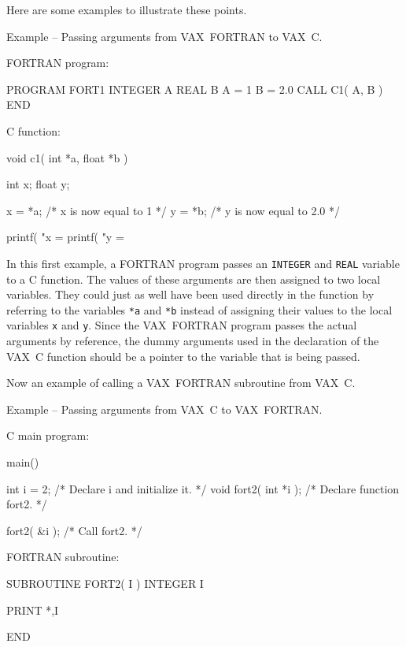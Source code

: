\documentclass[twoside,11pt,nolof]{starlink}
\newcounter{examples}
\begin{document}
Here are some examples to illustrate these points.

\label{vms_f2c}
\begin{center}
Example\latex{~\ref{vms_f2c}}
-- Passing arguments from VAX~FORTRAN to VAX~C\@.
\end{center}
\nopagebreak[4]
FORTRAN program:
\nopagebreak[4]
\begin{small}
\begin{terminalv}
      PROGRAM FORT1
      INTEGER A
      REAL B
      A = 1
      B = 2.0
      CALL C1( A, B )
      END
\end{terminalv}
\end{small}
\pagebreak[1]
C function:
\nopagebreak[4]
\begin{small}
\begin{terminalv}
void c1( int *a, float *b )
{
  int x;
  float y;

  x = *a;    /* x is now equal to 1 */
  y = *b;    /* y is now equal to 2.0 */

  printf( "x = %
  printf( "y = %
}
\end{terminalv}
\end{small}

In this first example, a FORTRAN program passes an \texttt{INTEGER} and
\texttt{REAL} variable to a C function.
The values of these arguments are then assigned to two local
variables. They could just as well have been used directly in the function by
referring to the variables  \texttt{*a} and \texttt{*b} instead of
assigning their values to the local variables \texttt{x} and \texttt{y}.
Since the VAX~FORTRAN program passes the actual arguments by reference, the
dummy arguments used in the declaration of the VAX~C function should be a
pointer to the variable that is being passed.

Now an example of calling a VAX~FORTRAN subroutine from VAX~C\@.

\pagebreak[3]
\label{vms_c2f}
\begin{center}
Example\latex{~\ref{vms_c2f}}
-- Passing arguments from VAX~C to VAX~FORTRAN\@.
\end{center}
\nopagebreak[4]
C main program:
\nopagebreak[4]
\begin{small}
\begin{terminalv}
main()
{
 int  i = 2;            /* Declare i and initialize it.  */
 void fort2( int *i );  /* Declare function fort2. */

 fort2( &i );           /* Call fort2.  */
}
\end{terminalv}
\end{small}
\pagebreak[1]
FORTRAN subroutine:
\nopagebreak[4]
\begin{small}
\begin{terminalv}
      SUBROUTINE FORT2( I )
      INTEGER I

      PRINT *,I

      END
\end{terminalv}
\end{small}
\end{document}
